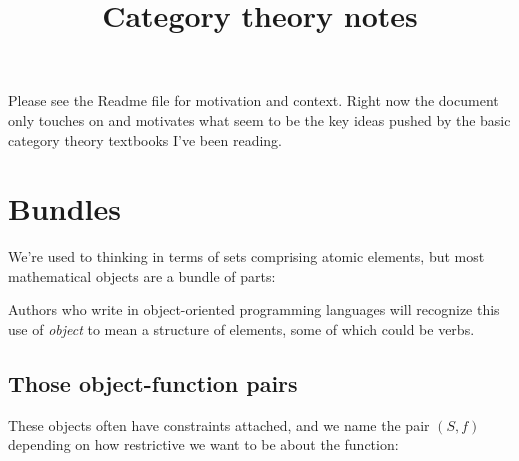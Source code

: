 \documentclass[11pt]{article}
\begin{document}


\title{Category theory notes}
\maketitle

Please see the Readme file for motivation and context. Right now the document only touches
on and motivates what seem to be the key ideas pushed by the basic category theory
textbooks I've been reading.

\section{Bundles}\label{bundlesec}
We're used to thinking in terms of sets comprising atomic elements, but
most mathematical objects are a bundle of parts:


Authors who write in object-oriented programming languages will recognize this
use of {\em object} to mean a structure of elements, some of which could be verbs.

\subsection{Those object-function pairs}
These objects often have constraints attached, and we name the pair $(S, f)$ depending on
how restrictive we want to be about the function:

\end{document}
